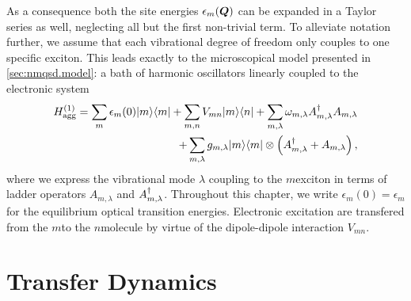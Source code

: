 As a consequence both the site energies $\epsilon_m(\boldsymbol{Q})$ can be expanded in a Taylor series as well, neglecting all but the first non-trivial term.
To alleviate notation further, we assume that each vibrational degree of freedom only couples to one specific exciton.
This leads exactly to the microscopical model presented in \autoref{sec:nmqsd.model}: a bath of harmonic oscillators linearly coupled to the electronic system
\begin{align}
  \label{eq:app.agg_hamil_twolevel}
  H_\mathrm{agg}^{(1)} =
  \sum_m \epsilon_m(0) | m \rangle\langle m | + \sum_{m,n} V_{mn} | m \rangle\langle n | + \sum_{m, \lambda} \omega_{m, \lambda} A^\dagger_{m, \lambda} A_{m, \lambda} \\
  + \sum_{m, \lambda} g_{m, \lambda} | m \rangle\langle m | \otimes \left( A^\dagger_{m, \lambda} + A_{m, \lambda} \right) \nonumber,
\end{align}
where we express the vibrational mode $\lambda$ coupling to the $m$\th exciton in terms of ladder operators $A_{m, \lambda}$ and $A^\dagger_{m, \lambda}$.
Throughout this chapter, we write $\epsilon_m(0) = \epsilon_m$ for the equilibrium optical transition energies.
Electronic excitation are transfered from the $m$\th to the $n$\th molecule by virtue of the dipole-dipole interaction $V_{mn}$.



\section{Transfer Dynamics }
\label{sec:app.fmo}


